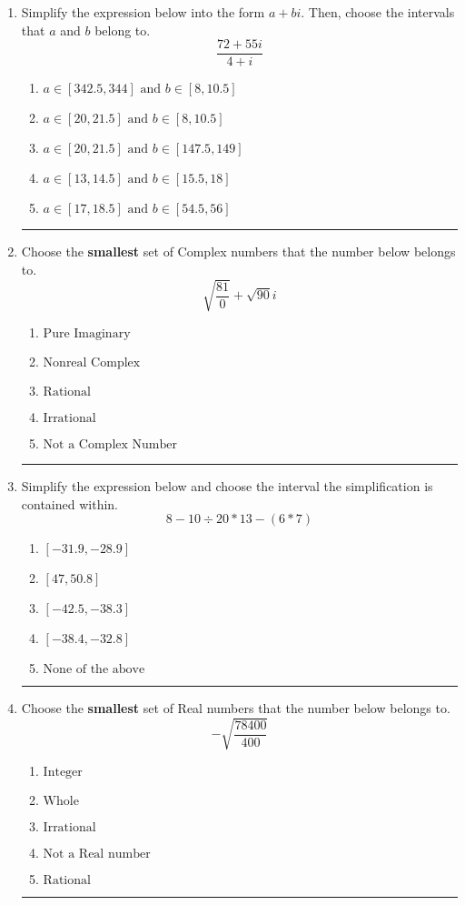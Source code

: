 \documentclass[14pt]{extbook}
\newcommand{\litem}[1]{\item#1\hspace*{-1cm}\rule{\textwidth}{0.4pt}}
\begin{document}
\begin{enumerate}
{\begin{enumerate}[label=\Alph*.]
\end{enumerate} }
\litem{
Simplify the expression below into the form $a+bi$. Then, choose the intervals that $a$ and $b$ belong to.\[ \frac{72 + 55 i}{4 + i} \]\begin{enumerate}[label=\Alph*.]
\item \( a \in [342.5, 344] \text{ and } b \in [8, 10.5] \)
\item \( a \in [20, 21.5] \text{ and } b \in [8, 10.5] \)
\item \( a \in [20, 21.5] \text{ and } b \in [147.5, 149] \)
\item \( a \in [13, 14.5] \text{ and } b \in [15.5, 18] \)
\item \( a \in [17, 18.5] \text{ and } b \in [54.5, 56] \)

\end{enumerate} }
\litem{
Choose the \textbf{smallest} set of Complex numbers that the number below belongs to.\[ \sqrt{\frac{81}{0}}+\sqrt{90} i \]\begin{enumerate}[label=\Alph*.]
\item \( \text{Pure Imaginary} \)
\item \( \text{Nonreal Complex} \)
\item \( \text{Rational} \)
\item \( \text{Irrational} \)
\item \( \text{Not a Complex Number} \)

\end{enumerate} }
\litem{
Simplify the expression below and choose the interval the simplification is contained within.\[ 8 - 10 \div 20 * 13 - (6 * 7) \]\begin{enumerate}[label=\Alph*.]
\item \( [-31.9, -28.9] \)
\item \( [47, 50.8] \)
\item \( [-42.5, -38.3] \)
\item \( [-38.4, -32.8] \)
\item \( \text{None of the above} \)

\end{enumerate} }
\litem{
Choose the \textbf{smallest} set of Real numbers that the number below belongs to.\[ -\sqrt{\frac{78400}{400}} \]\begin{enumerate}[label=\Alph*.]
\item \( \text{Integer} \)
\item \( \text{Whole} \)
\item \( \text{Irrational} \)
\item \( \text{Not a Real number} \)
\item \( \text{Rational} \)


\end{enumerate}}
\end{enumerate}
\end{document}
